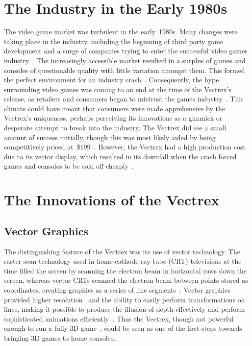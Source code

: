 \documentclass{scrartcl}
\begin{document}
\section*{The Industry in the Early 1980s}
The video game market was turbulent in the early~1980s. Many changes were taking place in the industry, including the beginning of third party game development and a surge of companies trying to enter the successful video games industry~\cite[p. 58]{wolf:pong}. The increasingly accessible market resulted in a surplus of games and consoles of questionable quality with little variation amongst them. This formed the perfect environment for an industry crash~\cite{ernkvist:crash}. 
Consequently, the hype surrounding video games was coming to an end at the time of the Vectrex's release, as retailers and consumers began to mistrust the games industry~\cite[p. 109]{wolf:pong}. This climate could have meant that consumers were made apprehensive by the Vectrex's uniqueness, perhaps perceiving its innovations as a gimmick or desperate attempt to break into the industry. 
The Vectrex did see a small amount of success initially, though this was most likely aided by being competitively priced at~\$199~\cite[p. 233]{kent:ultimate}. However, the Vectrex had a high production cost due to its vector display, which resulted in its downfall when the crash forced games and consoles to be sold off cheaply~\cite[p. 289]{baer:supercade}.



\section*{The Innovations of the Vectrex}


\subsection*{Vector Graphics}
The distinguishing feature of the Vectrex was its use of vector technology. The raster scan technology used in home cathode ray tube (CRT) televisions at the time filled the screen by scanning the electron beam in horizontal rows down the screen, whereas vector CRTs scanned the electron beam between points stored as coordinates, creating graphics as a series of line segments~\cite[pp. 20--21]{wolf:medium}. Vector graphics provided higher resolution~\cite[pp. 155--156]{perron:theory} and the ability to easily perform transformations on lines, making it possible to produce the illusion of depth effectively and perform sophisticated animations efficiently~\cite{defanti:impact}. Thus the Vectrex, though not powerful enough to run a fully 3D game~\cite[pp. 155--156]{perron:theory}, could be seen as one of the first steps towards bringing 3D games to home consoles.
\end{document}
